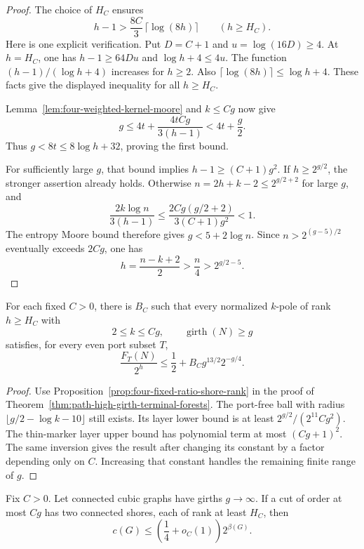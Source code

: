 \begin{proof}
The choice of $H_C$ ensures
\[
 h-1>\frac{8C}{3}\,\lceil\log(8h)\rceil
 \qquad(h\ge H_C).
\]
Here is one explicit verification.
Put $D=C+1$ and $u=\log(16D)\ge4$.
At $h=H_C$, one has $h-1\ge64Du$ and $\log h+4\le4u$.
The function $(h-1)/(\log h+4)$ increases for $h\ge2$.
Also $\lceil\log(8h)\rceil\le\log h+4$.
These facts give the displayed inequality for all $h\ge H_C$.

Lemma~\ref{lem:four-weighted-kernel-moore} and $k\le Cg$ now give
\[
 g\le4t+\frac{4tCg}{3(h-1)}<4t+\frac g2.
\]
Thus $g<8t\le8\log h+32$, proving the first bound.

For sufficiently large $g$, that bound implies $h-1\ge(C+1)g^2$.
If $h\ge2^{g/2}$, the stronger assertion already holds.
Otherwise $n=2h+k-2\le2^{g/2+2}$ for large $g$, and
\[
 \frac{2k\log n}{3(h-1)}
 \le\frac{2Cg(g/2+2)}{3(C+1)g^2}<1.
\]
The entropy Moore bound therefore gives $g<5+2\log n$.
Since $n>2^{(g-5)/2}$ eventually exceeds $2Cg$, one has
\[
 h=\frac{n-k+2}{2}>\frac n4>2^{g/2-5}.
\]
\end{proof}

\begin{corollary}
\label{cor:four-fixed-ratio-terminal-forests}
For each fixed $C>0$, there is $B_C$ such that every normalized $k$-pole of rank $h\ge H_C$ with
\[
 2\le k\le Cg,
 \qquad \operatorname{girth}(N)\ge g
\]
satisfies, for every even port subset $T$,
\[
 \frac{F_T(N)}{2^h}
 \le\frac12+B_C g^{13/2}2^{-g/4}.
\]
\end{corollary}

\begin{proof}
Use Proposition~\ref{prop:four-fixed-ratio-shore-rank} in the proof of Theorem~\ref{thm:path-high-girth-terminal-forests}.
The port-free ball with radius $\lfloor g/2-\log k-10\rfloor$ still exists.
Its layer lower bound is at least $2^{g/2}/(2^{11}Cg^2)$.
The thin-marker layer upper bound has polynomial term at most $(Cg+1)^2$.
The same inversion gives the result after changing its constant by a factor depending only on $C$.
Increasing that constant handles the remaining finite range of $g$.
\end{proof}

\begin{corollary}
\label{cor:four-fixed-ratio-cyclic-cuts}
Fix $C>0$.
Let connected cubic graphs have girths $g\to\infty$.
If a cut of order at most $Cg$ has two connected shores, each of rank at least $H_C$, then
\[
 c(G)\le\left(\frac14+o_C(1)\right)2^{\beta(G)}.
\]
\end{corollary}

